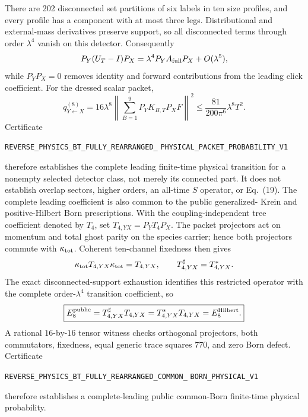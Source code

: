 \documentclass[11pt]{article}
\theoremstyle{definition}
\theoremstyle{remark}
\begin{document}
There are 202 disconnected set partitions of six labels in ten size profiles,
and every profile has a component with at most three legs.  Distributional
and external-mass derivatives preserve support, so all disconnected terms
through order $\lambda^4$ vanish on this detector.  Consequently
\[
 P_Y(U_T-I)P_X=\lambda^4P_YA_{\rm full}P_X+O(\lambda^5),
\]
while $P_YP_X=0$ removes identity and forward contributions from the leading
click coefficient.  For the dressed scalar packet,
\[
 q_{Y\leftarrow X}^{(8)}=16\lambda^8
 \left\|\sum_{B=1}^{9}P_YK_{B,T}P_XF\right\|^2
 \leq\frac{81}{200\pi^6}\lambda^8T^2.
\]
Certificate
\par\noindent
\texttt{REVERSE\_PHYSICS\_BT\_FULLY\_REARRANGED\_}
\allowbreak\texttt{PHYSICAL\_PACKET\_PROBABILITY\_V1}
\par\noindent
therefore establishes the complete leading finite-time physical transition
for a nonempty selected detector class, not merely its connected part.  It
does not establish overlap sectors, higher orders, an all-time $S$ operator,
or Eq.~(19).
The complete leading coefficient is also common to the public generalized-
Krein and positive-Hilbert Born prescriptions.  With the coupling-independent
tree coefficient denoted by $T_4$, set $T_{4,YX}=P_YT_4P_X$.  The packet
projectors act on momentum and total ghost parity on the species carrier;
hence both projectors commute with $\kappa_{\rm tot}$.  Coherent ten-channel
fixedness then gives
\[
 \kappa_{\rm tot}T_{4,YX}\kappa_{\rm tot}=T_{4,YX},\qquad
 T_{4,YX}^\sharp=T_{4,YX}^*.
\]
The exact disconnected-support exhaustion identifies this restricted
operator with the complete order-$\lambda^4$ transition coefficient, so
\[
 \boxed{E_8^{\rm public}=T_{4,YX}^\sharp T_{4,YX}
 =T_{4,YX}^*T_{4,YX}=E_8^{\rm Hilbert}.}
\]
A rational $16$-by-$16$ tensor witness checks orthogonal projectors, both
commutators, fixedness, equal generic trace squares $770$, and zero Born
defect.  Certificate
\par\noindent
\texttt{REVERSE\_PHYSICS\_BT\_FULLY\_REARRANGED\_COMMON\_}
\allowbreak\texttt{BORN\_PHYSICAL\_V1}
\par\noindent
therefore establishes a complete-leading public common-Born finite-time
physical probability.
\end{document}
